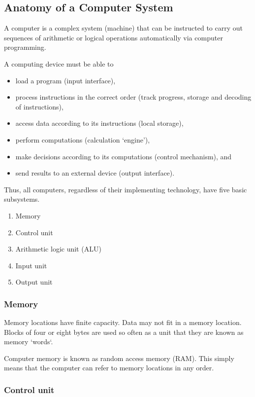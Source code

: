 \subsection{Anatomy of a Computer System}

A computer is a complex system (machine) that can be instructed to carry out sequences of arithmetic or logical operations automatically via computer programming.

A computing device must be able to
\begin{itemize}
  \item load a program (input interface),
  \item process instructions in the correct order (track progress, storage and decoding of instructions),
  \item access data according to its instructions (local storage),
  \item perform computations (calculation `engine'),
  \item make decisions according to its computations (control mechanism), and
  \item send results to an external device (output interface).
\end{itemize}

Thus, all computers, regardless of their implementing technology, have five basic subsystems.
\begin{enumerate}
  \item Memory
  \item Control unit
  \item Arithmetic logic unit (ALU)
  \item Input unit
  \item Output unit
\end{enumerate}

\subsubsection{Memory}

Memory locations have finite capacity.
Data may not fit in a memory location.
Blocks of four or eight bytes are used so often as a unit that they are known as memory `words`.

Computer memory is known as random access memory (RAM).
This simply means that the computer can refer to memory locations in any order.

\subsubsection{Control unit}

